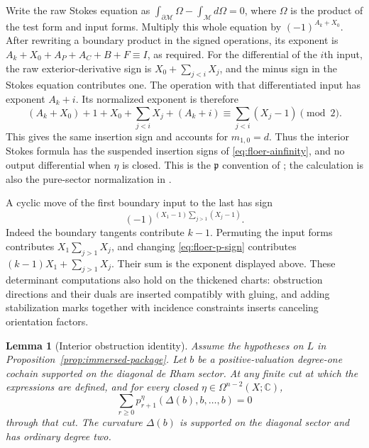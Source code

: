 \documentclass[11pt]{article}
\numberwithin{equation}{section}
\newtheorem{lemma}[theorem]{Lemma}
\theoremstyle{definition}
\theoremstyle{remark}
\newcommand{\C}{\mathbb C}
\begin{document}
Write the raw Stokes equation as
$\int_{\partial\mathcal M}\Omega-\int_{\mathcal M}d\Omega=0$,
where $\Omega$ is the product of the test form and input forms.
Multiply this whole equation by $(-1)^{A_k+X_0}$.  After rewriting
a boundary product in the signed operations, its exponent is
$A_k+X_0+A_P+A_C+B+F\equiv I$, as required.
For the differential of the $i$th input, the raw exterior-derivative
sign is $X_0+\sum_{j<i}X_j$, and the minus sign in the Stokes
equation contributes one.  The operation with that differentiated
input has exponent $A_k+i$.  Its normalized exponent is therefore
\[
 (A_k+X_0)+1+X_0+\sum_{j<i}X_j+(A_k+i)
 \equiv\sum_{j<i}(X_j-1)\pmod2.
\]
This gives the same insertion sign and accounts for $m_{1,0}=d$.
Thus the interior Stokes formula has the suspended insertion signs
of \eqref{eq:floer-ainfinity}, and no output differential when $\eta$
is closed.  This is the $\mathfrak p$ convention of
\cite[Section~3.8]{Floer:FOOO}; the calculation is also the pure-sector
normalization in \cite[Section~6]{W}.

A cyclic move of the first boundary input to the last has sign
\begin{equation}
 \label{eq:floer-cyclic-sign}
 (-1)^{(X_1-1)\sum_{j>1}(X_j-1)}.
\end{equation}
Indeed the boundary tangents contribute $k-1$.  Permuting the input
forms contributes $X_1\sum_{j>1}X_j$, and changing
\eqref{eq:floer-p-sign} contributes
$(k-1)X_1+\sum_{j>1}X_j$.  Their sum is the exponent displayed above.
These determinant computations also hold on the thickened charts:
obstruction directions and their duals are inserted compatibly with
gluing, and adding stabilization marks together with incidence
constraints inserts canceling orientation factors.

\begin{lemma}[Interior obstruction identity]
 \label{lem:interior-identity}
Assume the hypotheses on $L$ in Proposition~\ref{prop:immersed-package}.
Let $b$ be a positive-valuation degree-one cochain supported on the
diagonal de Rham sector.  At any finite cut at which the expressions are
defined, and for every closed $\eta\in\Omega^{n-2}(X;\C)$,
\begin{equation}
 \label{eq:floer-interior-identity}
 \sum_{r\geq0}p^\eta_{r+1}(\Delta(b),b,\ldots,b)=0
\end{equation}
through that cut.  The curvature $\Delta(b)$ is supported on the
diagonal sector and has ordinary degree two.
\end{lemma}
\end{document}
